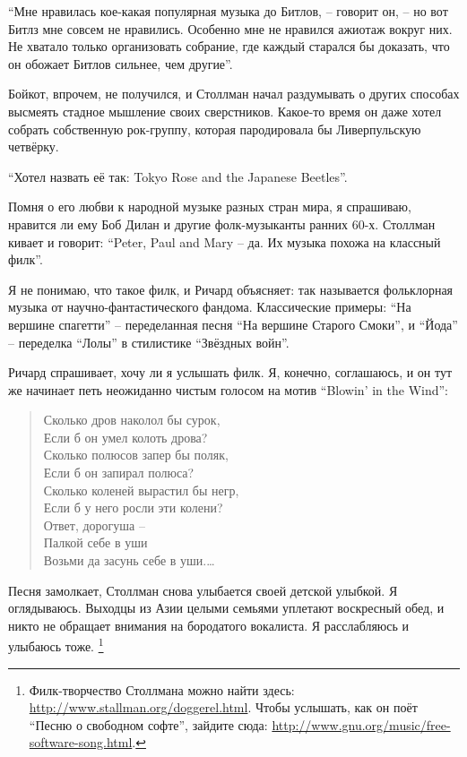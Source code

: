\enquote{Мне нравилась кое-какая популярная музыка до Битлов, -- говорит он, -- но вот Битлз мне совсем не нравились. Особенно мне не нравился ажиотаж вокруг них. Не хватало только организовать собрание, где каждый старался бы доказать, что он обожает Битлов сильнее, чем другие}.

Бойкот, впрочем, не получился, и Столлман начал раздумывать о других способах высмеять стадное мышление своих сверстников. Какое-то время он даже хотел собрать собственную рок-группу, которая пародировала бы Ливерпульскую четвёрку.

\enquote{Хотел назвать её так: Tokyo Rose and the Japanese Beetles}.

Помня о его любви к народной музыке разных стран мира, я спрашиваю, нравится ли ему Боб Дилан и другие фолк-музыканты ранних 60-х. Столлман кивает и говорит: \enquote{Peter, Paul and Mary -- да. Их музыка похожа на классный филк}.

Я не понимаю, что такое филк, и Ричард объясняет: так называется фольклорная музыка от научно-фантастического фандома. Классические примеры: \enquote{На вершине спагетти} -- переделанная песня \enquote{На вершине Старого Смоки}, и \enquote{Йода} -- переделка  \enquote{Лолы} в стилистике \enquote{Звёздных войн}.

Ричард спрашивает, хочу ли я услышать филк. Я, конечно, соглашаюсь, и он тут же начинает петь неожиданно чистым голосом на мотив \enquote{Blowin' in the Wind}:

\begin{verse}
Сколько дров наколол бы сурок,\\
Если б он умел колоть дрова?\\
Сколько полюсов запер бы поляк,\\
Если б он запирал полюса?\\
Сколько коленей вырастил бы негр,\\
Если б у него росли эти колени?\\
Ответ, дорогуша --\\
Палкой себе в уши\\
Возьми да засунь себе в уши.\ldots
\end{verse}

Песня замолкает, Столлман снова улыбается своей детской улыбкой. Я оглядываюсь. Выходцы из Азии целыми семьями уплетают воскресный обед, и никто не обращает внимания на бородатого вокалиста. Я расслабляюсь и улыбаюсь тоже. \footnote{Филк-творчество Столлмана можно найти здесь:  \url{http://www.stallman.org/doggerel.html}. Чтобы услышать, как он поёт \enquote{Песню о свободном софте}, зайдите сюда: \url{http://www.gnu.org/music/free-software-song.html}.}

